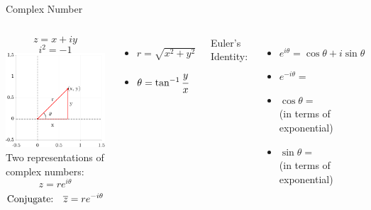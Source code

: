 \documentclass[aspectratio=169,xcolor=dvipsnames,svgnames,x11names,fleqn]{beamer}
\begin{document}

\begin{frame}{Complex Number}
 \begin{columns}
$$z = x +  i y$$
$$ i^2  = -1$$
\includegraphics[width=0.99\linewidth, trim=2cm 2cm 1cm 1cm,clip]{figures/complex_num.pdf}
Two representations of complex numbers:
$$
z = re^{i\theta}
$$
$$
\text{Conjugate:~~~} {\overline z} = re^{-i\theta}
$$
    \begin{itemize}
        \item $ r = \sqrt{x^2 + y^2}$
        \item $\theta = \tan ^{-1} \cfrac{y}{x}$
    \end{itemize}
    Euler's Identity:
    \begin{itemize}
        \item $e^{i\theta} = \cos \theta + i \sin \theta$
        \item $e^{- i\theta} = $
        \item $\cos \theta  = \quad\quad\quad\quad$\\ (in terms of exponential)
        \item $\sin \theta  = \quad\quad\quad\quad$\\ (in terms of exponential)
    \end{itemize}
\end{columns}
\end{frame}
\end{document}
